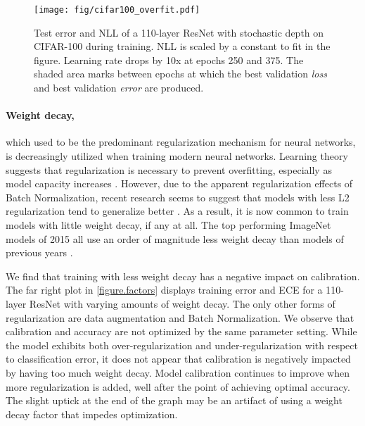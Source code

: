 \begin{figure}[t!]
	\centering
	\texttt{[image: fig/cifar100\_overfit.pdf]}
	\caption{Test error and NLL of a 110-layer ResNet with stochastic depth on CIFAR-100 during training. NLL is scaled by a constant to fit in the figure. Learning rate drops by 10x at epochs 250 and 375. The shaded area marks between epochs at which the best validation \emph{loss} and best validation \emph{error} are produced.}
	\label{figure.cifar100_overfit}
	\vspace{1ex}
\end{figure}

\paragraph{Weight decay,} which used to be the predominant regularization mechanism for neural networks, is decreasingly utilized when training modern neural networks. Learning theory suggests that regularization is necessary to prevent overfitting, especially as model capacity increases \cite{vapnik1998}. However, due to the apparent regularization effects of Batch Normalization, recent research seems to suggest that models with less L2 regularization tend to generalize better \cite{ioffe2015batch}. As a result, it is now common to train models with little weight decay, if any at all. The top performing ImageNet models of 2015 all use an order of magnitude less weight decay than models of previous years \cite{he2015deep, simonyan2014very}.

We find that training with less weight decay has a negative impact on calibration.
The far right plot in \autoref{figure.factors} displays training error and ECE for a 110-layer ResNet with varying amounts of weight decay.
The only other forms of regularization are data augmentation and Batch Normalization.
We observe that calibration and accuracy are not optimized by the same parameter setting.
While the model exhibits both over-regularization and under-regularization with respect to classification error, it does not appear that calibration is negatively impacted by having too much weight decay.
Model calibration continues to improve when more regularization is added, well after the point of achieving optimal accuracy.
The slight uptick at the end of the graph may be an artifact of using a weight decay factor that impedes optimization.

